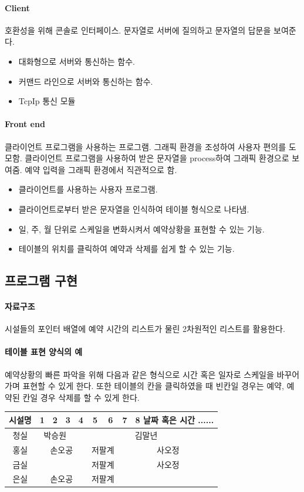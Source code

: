 \documentclass[12pt,a4paper]{report}
\begin{document}
\paragraph{Client} 
호환성을 위해 콘솔로 인터페이스.
문자열로 서버에 질의하고 문자열의 답문을 보여준다.
\begin{itemize}
	\item 대화형으로 서버와 통신하는 함수.
	\item 커맨드 라인으로 서버와 통신하는 함수.
	\item TcpIp 통신 모듈
\end{itemize}

\paragraph{Front end}
클라이언트 프로그램을 사용하는 프로그램. 그래픽 환경을 조성하여 사용자 편의를 도모함.
클라이언트 프로그램을 사용하여 받은 문자열을 process하여 그래픽 환경으로 보여줌. 예약 입력을 그래픽 환경에서 직관적으로 함.
\begin{itemize}
	\item 클라이언트를 사용하는 사용자 프로그램.
	\item 클라이언트로부터 받은 문자열을 인식하여 테이블 형식으로 나타냄.
	\item 일, 주, 월 단위로 스케일을 변화시켜서 예약상황을 표현할 수 있는 기능.
	\item 테이블의 위치를 클릭하여 예약과 삭제를 쉽게 할 수 있는 기능.
\end{itemize}

\subsection{프로그램 구현}

\paragraph{자료구조}
시설들의 포인터 배열에 예약 시간의 리스트가 물린 2차원적인 리스트를 활용한다.\\

\paragraph{테이블 표현 양식의 예}
예약상황의 빠른 파악을 위해 다음과 같은 형식으로 시간 혹은 일자로 스케일을 바꾸어 가며 표현할 수 있게 한다. 또한 테이블의 칸을 클릭하였을 때 빈칸일 경우는 예약, 예약된 칸일 경우 삭제를 할 수 있게 한다.\\
\begin{tabular}{|c|c|c|c|c|c|c|c|c|}
\hline
시설명& 1&2&3&4&5&6&7&8 날짜 혹은 시간 ......\\
\hline
청실& \multicolumn{3}{c|}{박승원} & \multicolumn{5}{c|}{김말년}\\
\hline
홍실& \multicolumn{4}{c|}{손오공}& \multicolumn{2}{c|}{저팔계}&\multicolumn{2}{c|}{사오정}\\
\hline
금실& \multicolumn{4}{c|}{}& \multicolumn{2}{c|}{저팔계}&\multicolumn{2}{c|}{사오정}\\
\hline
은실& \multicolumn{4}{c|}{손오공}& \multicolumn{2}{c|}{저팔계}&\multicolumn{2}{c|}{}\\
\hline

\end{tabular}
\end{document}
